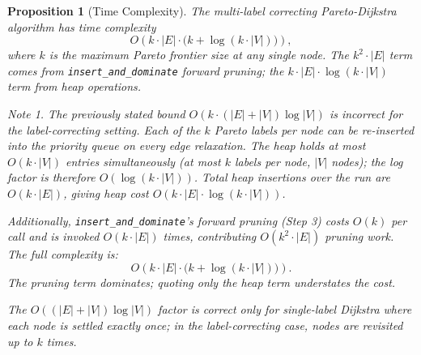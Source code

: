 \documentclass[11pt, a4paper]{article}
\newtheorem{proposition}[theorem]{Proposition}
\theoremstyle{remark}
\newtheorem*{note}{Note}
\begin{document}
\begin{proposition}[Time Complexity]
    \label{prop:complexity}
    The multi-label correcting Pareto-Dijkstra algorithm has time complexity
    \[
        O\!\left(k \cdot |E| \cdot \bigl(k + \log(k \cdot |V|)\bigr)\right),
    \]
    where $k$ is the maximum Pareto frontier size at any single node.
    The $k^2\cdot|E|$ term comes from \texttt{insert\_and\_dominate} forward
    pruning; the $k\cdot|E|\cdot\log(k\cdot|V|)$ term from heap operations.

    \begin{note}
    The previously stated bound $O(k\cdot(|E|+|V|)\log|V|)$ is incorrect for
    the label-correcting setting. Each of the $k$ Pareto labels per node can be
    re-inserted into the priority queue on every edge relaxation. The heap holds
    at most $O(k \cdot |V|)$ entries \emph{simultaneously} (at most $k$ labels
    per node, $|V|$ nodes); the log factor is therefore $O(\log(k\cdot|V|))$.
    Total heap insertions over the run are $O(k \cdot |E|)$, giving heap cost
    $O(k\cdot|E|\cdot\log(k\cdot|V|))$.

    Additionally, \texttt{insert\_and\_dominate}'s forward pruning (Step 3)
    costs $O(k)$ per call and is invoked $O(k\cdot|E|)$ times, contributing
    $O(k^2\cdot|E|)$ pruning work. The \emph{full} complexity is:
    \[
        O\!\left(k \cdot |E| \cdot \bigl(k + \log(k \cdot |V|)\bigr)\right).
    \]
    The pruning term dominates; quoting only the heap term understates the cost.

    The $O((|E|+|V|)\log|V|)$ factor is correct only for single-label Dijkstra
    where each node is settled exactly once; in the label-correcting case,
    nodes are revisited up to $k$ times.
    \end{note}


\end{proposition}
\end{document}

